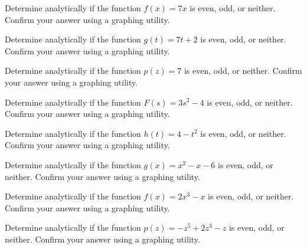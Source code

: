 \documentclass{ximera}
\begin{document}
\begin{problem}\label{evenoddornotpolyfirst}
Determine analytically if the function $f(x) = 7x$ is even, odd, or neither.  Confirm your answer using a graphing utility.  

\end{problem}

\begin{problem}
Determine analytically if the function $g(t) = 7t + 2$ is even, odd, or neither.  Confirm your answer using a graphing utility.  
\end{problem}
 
\begin{problem}
Determine analytically if the function $p(z) = 7$ is even, odd, or neither.  Confirm your answer using a graphing utility.  

\end{problem}

\begin{problem}
Determine analytically if the function $F(s) = 3s^2 - 4$ is even, odd, or neither.  Confirm your answer using a graphing utility.  
\end{problem}

\begin{problem}
Determine analytically if the function $h(t) = 4-t^2$ is even, odd, or neither.  Confirm your answer using a graphing utility. 

\end{problem} 

\begin{problem}
Determine analytically if the function $g(x) = x^2-x-6$ is even, odd, or neither.  Confirm your answer using a graphing utility.  
\end{problem} 

\begin{problem}
Determine analytically if the function $f(x) = 2x^3 - x$ is even, odd, or neither.  Confirm your answer using a graphing utility.  

\end{problem} 

\begin{problem}
Determine analytically if the function $p(z) = -z^5 + 2z^3 - z$ is even, odd, or neither.  Confirm your answer using a graphing utility.  
\end{problem} 
\end{document}
